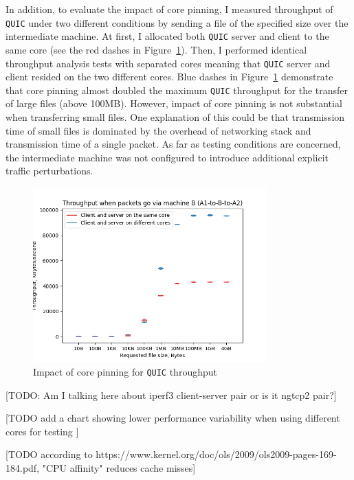 \documentclass[12pt,a4paper,twoside,openright]{report}
\begin{document}
In addition, to evaluate the impact of core pinning, I measured throughput of \texttt{QUIC} under two different conditions by sending a file of the specified size over the intermediate machine.
At first, I allocated both \texttt{QUIC} server and client to the same core (see the red dashes in Figure~\ref{fig:Throughput_via_A-to-B-to-A_MTU=1500}).
Then, I performed identical throughput analysis tests with separated cores meaning that \texttt{QUIC} server and client resided on the two different cores.
Blue dashes in Figure~\ref{fig:Throughput_via_A-to-B-to-A_MTU=1500} demonstrate that core pinning almost doubled the maximum \texttt{QUIC} throughput for the transfer of large files (above 100MB).
However, impact of core pinning is not substantial when transferring small files.
One explanation of this could be that transmission time of small files is dominated by the overhead of networking stack and transmission time of a single packet.
As far as testing conditions are concerned, the intermediate machine was not configured to introduce additional explicit traffic perturbations.
    \begin{figure}[H]
    \centering
    \includegraphics[width=0.8\textwidth]{figs/Throughput via node B (A-to-B-to-A)_MTU=1500.png}
    \caption{Impact of core pinning for \texttt{QUIC} throughput}
    \label{fig:Throughput_via_A-to-B-to-A_MTU=1500}
    \end{figure}
[TODO: Am I talking here about iperf3 client-server pair or is it ngtcp2 pair?]

[TODO add a chart showing lower performance variability when using different cores for testing ]

[TODO according to https://www.kernel.org/doc/ols/2009/ols2009-pages-169-184.pdf, "CPU affinity" reduces cache misses]
\end{document}
